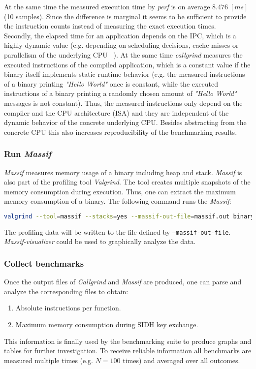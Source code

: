At the same time the measured execution time by \textit{perf} is on average $8.476\;[ms]$ (10 samples). Since the difference is marginal it seems to be sufficient to provide the instruction counts instead of measuring the exact execution times.
\\
Secondly, the elapsed time for an application depends on the \gls{IPC}, which is a highly dynamic value (e.g. depending on scheduling decisions, cache misses or parallelism of the underlying \gls{CPU} ~\parencite{alameldeen2006ipc}). At the same time \textit{callgrind} measures the executed instructions of the compiled application, which is a constant value if the binary itself implements static runtime behavior (e.g. the measured instructions of a binary printing \textit{"Hello World"} once is constant, while the executed instructions of a binary printing a randomly chosen amount of \textit{"Hello World"} messages is not constant). Thus, the measured instructions only depend on the compiler and the \gls{CPU} architecture (\gls{ISA}) and they are independent of the dynamic behavior of the concrete underlying \gls{CPU}. Besides abstracting from the concrete \gls{CPU} this also increases reproducibility of the benchmarking results.

\subsubsection{Run \textit{Massif}}
\textit{Massif} measures memory usage of a binary including heap and stack. \textit{Massif} is also part of the profiling tool \textit{Valgrind}. The tool creates multiple snapshots of the memory consumption during execution. Thus, one can extract the maximum memory consumption of a binary. The following command runs the \textit{Massif}:
\begin{lstlisting}[language=Bash]
valgrind --tool=massif --stacks=yes --massif-out-file=massif.out binary
\end{lstlisting}
The profiling data will be written to the file defined by \texttt{--massif-out-file}. \textit{Massif-visualizer} could be used to graphically analyze the data.

\subsubsection{Collect benchmarks}
Once the output files of \textit{Callgrind} and \textit{Massif} are produced, one can parse and analyze the corresponding files to obtain:
\begin{enumerate}
\item Absolute instructions per function.
\item Maximum memory consumption during \gls{SIDH} key exchange.
\end{enumerate}
This information is finally used by the benchmarking suite to produce graphs and tables for further investigation. To receive reliable information all benchmarks are measured multiple times (e.g. $N=100$ times) and averaged over all outcomes.

